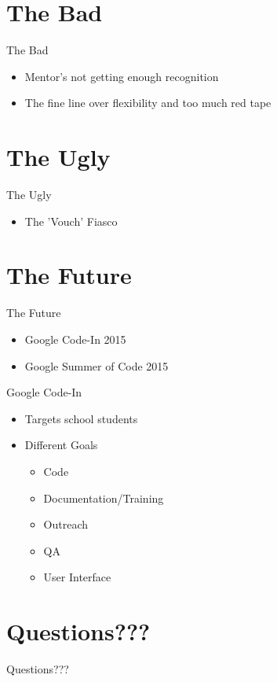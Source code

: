 \documentclass{beamer}
\begin{document}
\section{The Bad}
\begin{frame}{The Bad}
\pause
\begin{itemize}
\item Mentor's not getting enough recognition \pause
\item The fine line over flexibility and too much red tape \pause
\end{itemize}
\end{frame}

\section{The Ugly}
\begin{frame}{The Ugly}
\pause
\begin{itemize}
\item The 'Vouch' Fiasco \pause
\end{itemize}
\end{frame}

\section{The Future}
\begin{frame}{The Future}
\pause
\begin{itemize}
\item Google Code-In 2015
\item Google Summer of Code 2015
\end{itemize}
\end{frame}

\begin{frame}{Google Code-In}
\pause
\begin{itemize}
\item Targets school students
\item Different Goals
\pause
\begin{itemize}
\item Code
\item Documentation/Training
\item Outreach
\item QA
\item User Interface
\end{itemize}
\end{itemize}
\end{frame}

\section{Questions???}
\pause
\begin{frame}{Questions???}
\end{frame}
\end{document}
